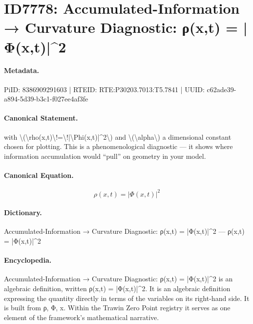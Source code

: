 \section*{ID7778: Accumulated-Information → Curvature Diagnostic: ρ(x,t) = |Φ(x,t)|\textasciicircum{}2}
\paragraph{Metadata.}
PiID: 8386909291603 | RTEID: RTE:P30203.7013:T5.7841 | UUID: c62ade39-a894-5d39-b3c1-f027ee4af3fe

\paragraph{Canonical Statement.}
with \textbackslash{}(\textbackslash{}rho(x,t)\textbackslash{}!=\textbackslash{}!|\textbackslash{}Phi(x,t)|\textasciicircum{}2\textbackslash{}) and \textbackslash{}(\textbackslash{}alpha\textbackslash{}) a dimensional constant chosen for plotting. This is a phenomenological diagnostic — it shows where information accumulation would “pull” on geometry in your model.

\paragraph{Canonical Equation.}
\[
\rho(x,t)\!=\!|\Phi(x,t)|^2
\]

\paragraph{Dictionary.}
Accumulated-Information → Curvature Diagnostic: ρ(x,t) = |Φ(x,t)|\textasciicircum{}2 — ρ(x,t) = |Φ(x,t)|\textasciicircum{}2

\paragraph{Encyclopedia.}
Accumulated-Information → Curvature Diagnostic: ρ(x,t) = |Φ(x,t)|\textasciicircum{}2 is an algebraic definition, written ρ(x,t) = |Φ(x,t)|\textasciicircum{}2. It is an algebraic definition expressing the quantity directly in terms of the variables on its right-hand side. It is built from ρ, Φ, x. Within the Trawin Zero Point registry it serves as one element of the framework's mathematical narrative.
